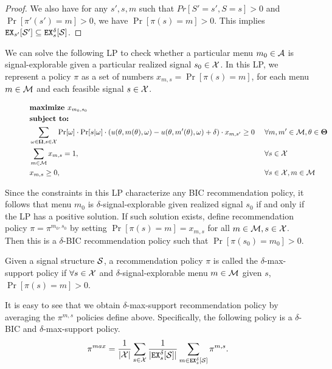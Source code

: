 \begin{proof}
We also have for any $s', s ,m$ such that $Pr[S' = s',S = s] >0 $ and $\Pr[\pi'(s') = m] >0$, we have $\Pr[\pi(s) = m] > 0$. This implies $\EX_{s'}[\S'] \subseteq \EX^{\delta}_s[\S]$.
\end{proof}


We can solve the following LP to check whether a particular menu $m_0 \in\A$ is signal-explorable given a particular realized signal $s_0\in\X$. In this LP, we represent a policy $\pi$ as a set of numbers
    $x_{m,s} = \Pr[\pi(s)=m]$,
for each menu $m\in \M$ and each feasible signal $s\in \X$.

\begin{figure}[H]
\begin{mdframed}
\begin{alignat*}{2}
 & \textbf{maximize }    x_{m_0,s_0}\  \\
&  \textbf{subject to: }\\
 & \sum_{\omega \in \varOmega, s \in \X} \Pr[\omega] \cdot \Pr[s | \omega] \cdot \left(u(\theta, m(\theta), \omega) - u(\theta, m'(\theta), \omega) + \delta\right) \cdot x_{m,s'} \geq 0  &\ & \forall m,m' \in \M, \theta \in \varTheta \\
                       & \sum_{m\in \M} x_{m,s} = 1,  \ &\ & \forall s \in \X \\
                       & x_{m,s} \geq 0,  \ &\ & \forall s \in \X, m\in \M \\
\end{alignat*}
\end{mdframed}
\label{fig:nocc_lp}
\end{figure}

Since the constraints in this LP characterize any BIC recommendation policy, it follows that menu $m_0$ is $\delta$-signal-explorable given realized signal $s_0$ if and only if the LP has a positive solution. If such solution exists, define recommendation policy $\pi = \pi^{m_0,s_0}$ by setting $\Pr[\pi(s) = m] = x_{m,s}$ for all $m \in \M, s \in \X$. Then this is a $\delta$-BIC recommendation policy such that $\Pr[\pi(s_0) = m_0] > 0$.

\begin{definition}
Given a signal structure $\S$, a recommendation policy $\pi$ is called the $\delta$-max-support policy if $\forall s \in \X$  and $\delta$-signal-explorable menu $m\in \M$ given $s$, $\Pr[\pi(s) = m] > 0$.
\end{definition}

It is easy to see that we obtain $\delta$-max-support recommendation policy by averaging the $\pi^{m,s}$ policies define above.
Specifically, the following policy is a $\delta$-BIC and $\delta$-max-support policy.
\begin{align}
\label{eq:pimax2}
\pi^{max} = \frac{1}{|\X|} \sum_{s \in \X} \frac{1}{|\EX_s^{\delta}[\S]|} \sum_{m \in \EX_s^{\delta}[\S]} \pi^{m,s}.
\end{align}


